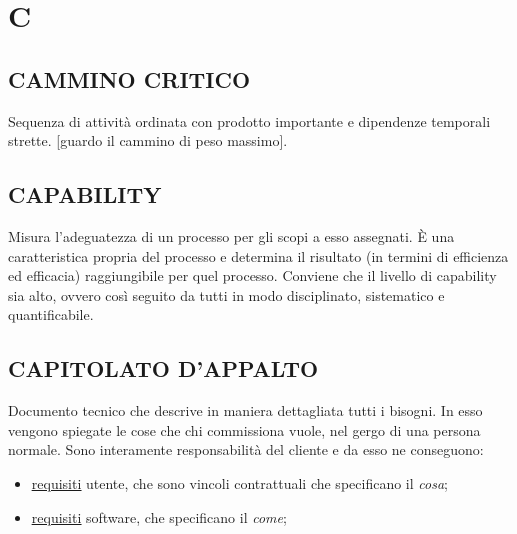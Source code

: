 \newpage
	\flushright{\hyperref[index]{\color{black!65}{Ritorna all'indice}}}\flushleft
	\section{C} \label{sec:C}
	
		\subsection{CAMMINO CRITICO}  \label{camminocritico}
		Sequenza di attività ordinata con prodotto importante e dipendenze temporali strette. [guardo il cammino di peso massimo].
		
		\subsection{CAPABILITY}	 \label{capability} %
		Misura l’adeguatezza di un processo per gli scopi a esso assegnati. È una caratteristica propria del processo e  determina il risultato (in termini di efficienza ed efficacia) raggiungibile per quel processo. Conviene che il livello di capability sia alto, ovvero così seguito da tutti in modo disciplinato, sistematico e quantificabile.
		
		\subsection{CAPITOLATO D'APPALTO}  \label{capitolati}
		Documento tecnico che descrive in maniera dettagliata tutti i bisogni. In esso vengono spiegate le cose che chi commissiona vuole, nel gergo di una persona normale. Sono interamente responsabilità del cliente e da esso ne conseguono:
			\begin{itemize}
				\item \underline{\hyperref[requirements]{requisiti}} utente, che sono vincoli contrattuali che specificano il \textit{cosa};
				\item \underline{\hyperref[requirements]{requisiti}} software, che specificano il \textit{come};
			\end{itemize} 
		
